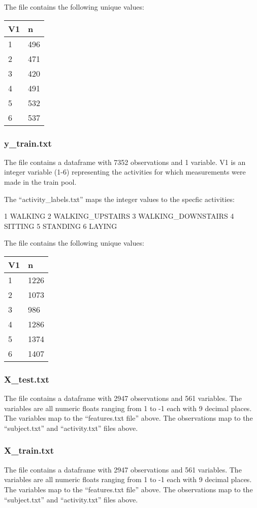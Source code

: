 \documentclass[
]{article}
\begin{document}
The file contains the following unique values:

\begin{longtable}[]{@{}ll@{}}
\toprule()
V1 & n \\
\midrule()
\endhead
1 & 496 \\
2 & 471 \\
3 & 420 \\
4 & 491 \\
5 & 532 \\
6 & 537 \\
\bottomrule()
\end{longtable}

\hypertarget{y_train.txt}{%
\subsubsection{y\_train.txt}\label{y_train.txt}}

The file contains a dataframe with 7352 observations and 1 variable. V1
is an integer variable (1-6) representing the activities for which
measurements were made in the train pool.

The ``activity\_labels.txt'' maps the integer values to the specfic
activities:

1 WALKING 2 WALKING\_UPSTAIRS 3 WALKING\_DOWNSTAIRS 4 SITTING 5 STANDING
6 LAYING

The file contains the following unique values:

\begin{longtable}[]{@{}ll@{}}
\toprule()
V1 & n \\
\midrule()
\endhead
1 & 1226 \\
2 & 1073 \\
3 & 986 \\
4 & 1286 \\
5 & 1374 \\
6 & 1407 \\
\bottomrule()
\end{longtable}

\hypertarget{x_test.txt}{%
\subsubsection{X\_test.txt}\label{x_test.txt}}

The file contains a dataframe with 2947 observations and 561 variables.
The variables are all numeric floats ranging from 1 to -1 each with 9
decimal places. The variables map to the ``features.txt file'' above.
The observations map to the ``subject.txt'' and ``activity.txt'' files
above.

\hypertarget{x_train.txt}{%
\subsubsection{X\_train.txt}\label{x_train.txt}}

The file contains a dataframe with 2947 observations and 561 variables.
The variables are all numeric floats ranging from 1 to -1 each with 9
decimal places. The variables map to the ``features.txt file'' above.
The observations map to the ``subject.txt'' and ``activity.txt'' files
above.
\end{document}
